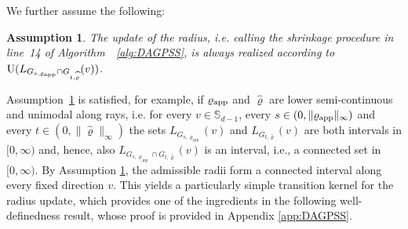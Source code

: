 \documentclass[sn-mathphys-num]{sn-jnl}%
\theoremstyle{thmstyleone}%
\theoremstyle{thmstyletwo}%
\newtheorem{remark}{Remark}%
\theoremstyle{thmstylethree}%
\newtheorem{assumption}{Assumption}%
\newcommand{\rhoapp}{\varrho_{{\rm app}}}
\newcommand{\change}[1]{\bgroup\color{black}#1\egroup}    %
\begin{document}

We further assume the following:
\begin{assumption}\label{assum:radius:update}
The update of the radius, i.e. calling the shrinkage procedure in line~14 of Algorithm~~\ref{alg:DAGPSS}, is always realized according to 
$\mathrm{U}(L_{G_{s,\rhoapp} \cap G_{t,\widehat{\varrho}}}(v))$.   
\end{assumption}

\change{%
Assumption~\ref{assum:radius:update} is satisfied, for example, if $\rhoapp$ and $\widehat{\varrho}$ are lower semi-continuous and}
unimodal along rays, i.e. for every $v \in \mathbb{S}_{d-1}$, every $s\in(0,\|\rhoapp\|_\infty)$ and every $t\in(0,\|\widehat{\varrho}\|_\infty)$ the sets $L_{G_{s,\varrho_{\text{app}}}}(v)$ and $L_{G_{t,\widehat{\varrho}}}(v)$ are both intervals in $[0,\infty)$ and, hence, also $L_{G_{s,\varrho_{\text{app}}}\cap G_{t,\widehat{\varrho}}}(v)$ is an interval, i.e., a connected set in $[0,\infty)$.
\change{By Assumption \ref{assum:radius:update}, the admissible radii form a connected interval along every fixed direction $v$. This yields a particularly simple transition kernel for the radius update, which provides one of the ingredients in the following well-definedness result, whose proof is provided in Appendix \ref{app:DAGPSS}.}

\end{document}
